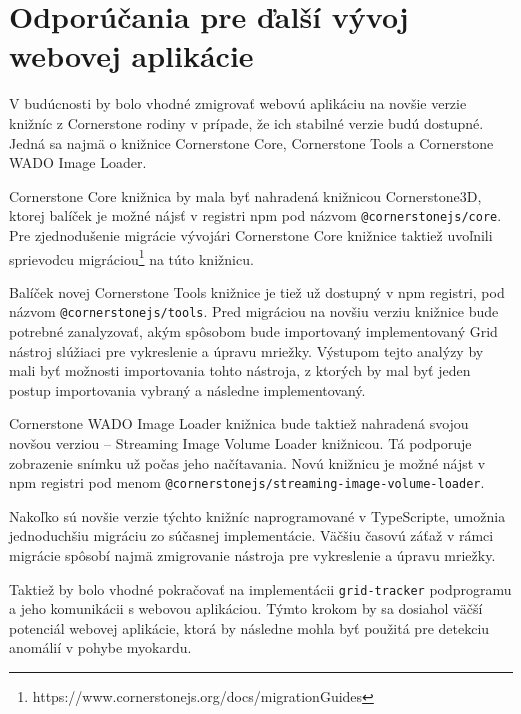 \chapter {Odporúčania pre ďalší vývoj webovej aplikácie}
V budúcnosti by bolo vhodné zmigrovať webovú aplikáciu na novšie verzie knižníc z Cornerstone rodiny v prípade, že ich stabilné verzie budú dostupné. Jedná sa najmä o knižnice Cornerstone Core, Cornerstone Tools a Cornerstone WADO Image Loader.

Cornerstone Core knižnica by mala byť nahradená knižnicou Cornerstone3D, ktorej balíček je možné nájsť v registri npm pod názvom \newline \texttt{@cornerstonejs/core}. Pre zjednodušenie migrácie vývojári Cornerstone Core knižnice taktiež uvoľnili sprievodcu migráciou\footnote{https://www.cornerstonejs.org/docs/migrationGuides} na túto knižnicu.

Balíček novej Cornerstone Tools knižnice je tiež už dostupný v npm registri, pod názvom \texttt{@cornerstonejs/tools}. Pred migráciou na novšiu verziu knižnice bude potrebné zanalyzovať, akým spôsobom bude importovaný implementovaný Grid nástroj slúžiaci pre vykreslenie a úpravu mriežky. Výstupom tejto analýzy by mali byť možnosti importovania tohto nástroja, z ktorých by mal byť jeden postup importovania vybraný a následne implementovaný.

Cornerstone WADO Image Loader knižnica bude taktiež nahradená svojou novšou verziou -- Streaming Image Volume Loader knižnicou. Tá podporuje zobrazenie snímku už počas jeho načítavania. Novú knižnicu je možné nájst v npm registri pod menom \texttt{@cornerstonejs/streaming-image-volume-loader}.

Nakoľko sú novšie verzie týchto knižníc naprogramované v TypeScripte, umožnia jednoduchšiu migráciu zo súčasnej implementácie. \clearpage Väčšiu časovú záťaž v rámci migrácie spôsobí najmä zmigrovanie nástroja pre vykreslenie a úpravu mriežky.

Taktiež by bolo vhodné pokračovať na implementácii \texttt{grid-tracker} podprogramu a jeho komunikácii s webovou aplikáciou. Týmto krokom by sa dosiahol väčší potenciál webovej aplikácie, ktorá by následne mohla byť použitá pre detekciu anomálií v pohybe myokardu.